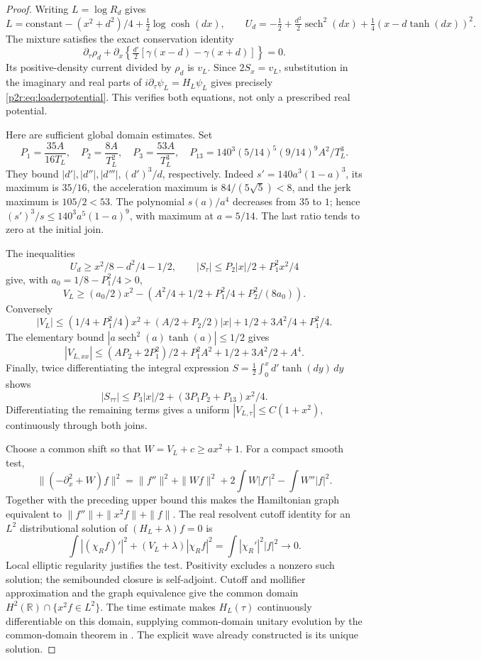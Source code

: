 \documentclass[11pt]{article}
\numberwithin{equation}{section}
\theoremstyle{definition}
\theoremstyle{remark}
\begin{document}
\begin{proof}
Writing $L=\log R_d$ gives
\[
 L=\text{constant}-(x^2+d^2)/4+\tfrac12\log\cosh(dx),\qquad
 U_d=-\tfrac12+\tfrac{d^2}{2}\operatorname{sech}^2(dx)
                  +\tfrac14(x-d\tanh(dx))^2 .
\]
The mixture satisfies the exact conservation identity
\[
 \partial_\tau\rho_d+
 \partial_x\!\left\{\tfrac{d'}2[\gamma(x-d)-\gamma(x+d)]\right\}=0.
\]
Its positive-density current divided by $\rho_d$ is $v_L$.
Since $2S_x=v_L$, substitution in the imaginary and real parts of
$i\partial_\tau\psi_L=H_L\psi_L$ gives precisely
\eqref{p2r:eq:loaderpotential}. This verifies both equations, not
only a prescribed real potential.

Here are sufficient global domain estimates. Set
\[
 P_1=\frac{35A}{16T_L},\quad P_2=\frac{8A}{T_L^2},\quad
 P_3=\frac{53A}{T_L^3},\quad
 P_{13}=140^3(5/14)^5(9/14)^9 A^2/T_L^3 .
\]
They bound $|d'|,|d''|,|d'''|,(d')^3/d$, respectively. Indeed
$s'=140a^3(1-a)^3$, its maximum is $35/16$, the acceleration
maximum is $84/(5\sqrt5)<8$, and the jerk maximum is $105/2<53$.
The polynomial $s(a)/a^4$ decreases from $35$ to $1$; hence
$(s')^3/s\leq140^3a^5(1-a)^9$, with maximum at $a=5/14$.
The last ratio tends to zero at the initial join.

The inequalities
\[
 U_d\geq x^2/8-d^2/4-1/2,\qquad
 |S_\tau|\leq P_2|x|/2+P_1^2x^2/4
\]
give, with $a_0=1/8-P_1^2/4>0$,
\[
 V_L\geq (a_0/2)x^2-
 \left(A^2/4+1/2+P_1^2/4+P_2^2/(8a_0)\right).
\]
Conversely
\[
 |V_L|\leq(1/4+P_1^2/4)x^2+
               (A/2+P_2/2)|x|+1/2+3A^2/4+P_1^2/4.
\]
The elementary bound
$|a\operatorname{sech}^2(a)\tanh(a)|\leq1/2$ gives
\[
 |V_{L,xx}|\leq(AP_2+2P_1^2)/2+P_1^2A^2
                                      +1/2+3A^2/2+A^4.
\]
Finally, twice differentiating the integral expression
$S=\frac12\int_0^x d'\tanh(dy)\,dy$ shows
\[
 |S_{\tau\tau}|\leq P_3|x|/2+
                             (3P_1P_2+P_{13})x^2/4.
\]
Differentiating the remaining terms gives a uniform
$|V_{L,\tau}|\leq C(1+x^2)$, continuously through both joins.

Choose a common shift so that $W=V_L+c\geq a x^2+1$.
For a compact smooth test,
\[
 \|(-\partial_x^2+W)f\|^2
 =\|f''\|^2+\|Wf\|^2+
          2\int W|f'|^2-\int W''|f|^2 .
\]
Together with the preceding upper bound this makes the Hamiltonian
graph equivalent to $\|f''\|+\|x^2f\|+\|f\|$.
The real resolvent cutoff identity for an $L^2$ distributional
solution of $(H_L+\lambda)f=0$ is
\[
 \int |(\chi_Rf)'|^2+(V_L+\lambda)|\chi_Rf|^2
       =\int|\chi_R'|^2|f|^2\longrightarrow0.
\]
Local elliptic regularity justifies the test. Positivity excludes a
nonzero such solution; the semibounded closure is self-adjoint.
Cutoff and mollifier approximation and the graph equivalence give the
common domain $H^2(\mathbb R)\cap\{x^2f\in L^2\}$.
The time estimate makes $H_L(\tau)$ continuously differentiable on
this domain, supplying common-domain unitary evolution by the
common-domain theorem in \cite{SchmidGriesemer2014}. The explicit
wave already constructed is its unique solution.


\end{proof}
\end{document}
